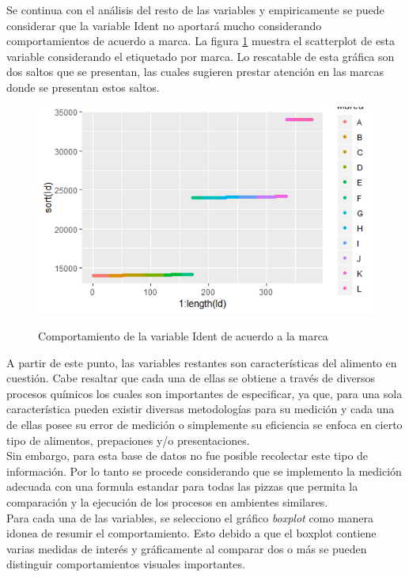 \documentclass[12pt, letterpaper]{article}
\begin{document}
Se continua con el análisis del resto de las variables y empiricamente se puede considerar que la variable Ident no aportará mucho considerando comportamientos de acuerdo a marca. La figura \ref{i2} muestra el scatterplot de esta variable considerando el etiquetado por marca. Lo rescatable de esta gráfica son dos saltos que se presentan, las cuales sugieren prestar atención en las marcas donde se presentan estos saltos.\\

\begin{figure}[h]
\centering
\includegraphics[scale=1]{images/ident.png} 
\label{i2}
\caption{Comportamiento de la variable Ident de acuerdo a la marca}
\end{figure}

A partir de este punto, las variables restantes son características del alimento en cuestión. Cabe resaltar que cada una de ellas se obtiene a través de diversos procesos químicos los cuales son importantes de especificar, ya que, para una sola característica pueden existir diversas metodologías para su medición y cada una de ellas posee su error de medición o simplemente su eficiencia se enfoca en cierto tipo de alimentos, prepaciones y/o presentaciones.\\

Sin embargo, para esta base de datos no fue posible recolectar este tipo de información. Por lo tanto se procede considerando que se implemento la medición adecuada con una formula estandar para todas las pizzas que permita la comparación y la ejecución de los procesos en ambientes similares.\\

Para cada una de las variables, se selecciono el gráfico \emph{boxplot} como manera idonea de resumir el comportamiento. Esto debido a que el boxplot contiene varias medidas de interés y gráficamente al comparar dos o más se pueden distinguir comportamientos visuales importantes.\\
\end{document}
